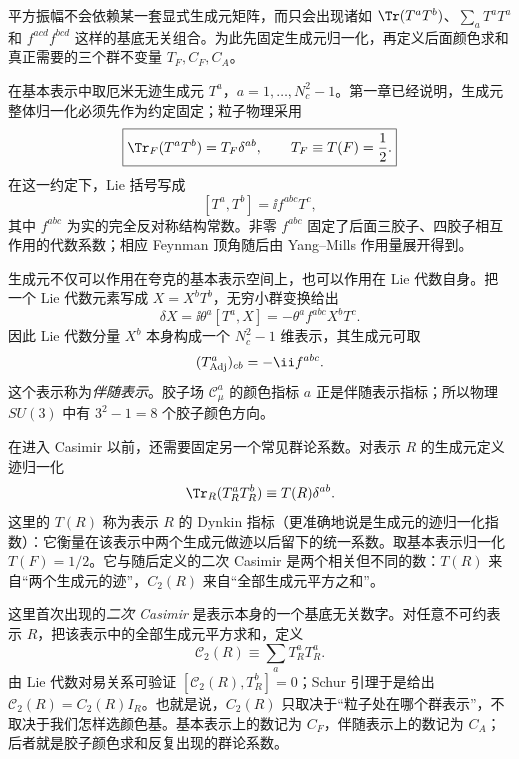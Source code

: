 平方振幅不会依赖某一套显式生成元矩阵，而只会出现诸如 $\Tr(T^aT^b)$、$\sum_aT^aT^a$ 和 $f^{acd}f^{bcd}$ 这样的基底无关组合。为此先固定生成元归一化，再定义后面颜色求和真正需要的三个群不变量 $T_F,C_F,C_A$。

在基本表示中取厄米无迹生成元 $T^a$，$a=1,\ldots,N_c^2-1$。第一章已经说明，生成元整体归一化必须先作为约定固定；粒子物理采用
\begin{equation}
 \boxed{
 \Tr_F(T^aT^b)=T_F\delta^{ab},
 \qquad T_F\equiv T(F)=\frac12.}
 \label{eq:SUN-generator-normalization-dp10}
\end{equation}
在这一约定下，Lie 括号写成
\begin{equation}
 \boxed{
 [T^a,T^b]=\ii f^{abc}T^c,}
 \label{eq:SUN-commutator-dp10}
\end{equation}
其中 $f^{abc}$ 为实的完全反对称结构常数。非零 $f^{abc}$ 固定了后面三胶子、四胶子相互作用的代数系数；相应 Feynman 顶角随后由 Yang--Mills 作用量展开得到。

生成元不仅可以作用在夸克的基本表示空间上，也可以作用在 Lie 代数自身。把一个 Lie 代数元素写成 $X=X^bT^b$，无穷小群变换给出
\begin{equation*}
 \delta X=\ii\theta^a[T^a,X]
 =-\theta^af^{abc}X^bT^c.
\end{equation*}
因此 Lie 代数分量 $X^b$ 本身构成一个 $N_c^2-1$ 维表示，其生成元可取
\begin{equation*}
 (T_{\rm Adj}^a)_{cb}=-\ii f^{abc}.
\end{equation*}
这个表示称为\emph{伴随表示}。胶子场 $\mathscr C_\mu^a$ 的颜色指标 $a$ 正是伴随表示指标；所以物理 $SU(3)$ 中有 $3^2-1=8$ 个胶子颜色方向。

在进入 Casimir 以前，还需要固定另一个常见群论系数。对表示 $R$ 的生成元定义迹归一化
\begin{equation*}
 \Tr_R(T_R^aT_R^b)\equiv T(R)\delta^{ab}.
\end{equation*}
这里的 $T(R)$ 称为表示 $R$ 的 Dynkin 指标（更准确地说是生成元的迹归一化指数）：它衡量在该表示中两个生成元做迹以后留下的统一系数。取基本表示归一化 $T(F)=1/2$。它与随后定义的二次 Casimir 是两个相关但不同的数：$T(R)$ 来自“两个生成元的迹”，$C_2(R)$ 来自“全部生成元平方之和”。

这里首次出现的\emph{二次 Casimir} 是表示本身的一个基底无关数字。对任意不可约表示 $R$，把该表示中的全部生成元平方求和，定义
\begin{equation*}
 \mathcal C_2(R)\equiv\sum_a T_R^aT_R^a.
\end{equation*}
由 Lie 代数对易关系可验证 $[\mathcal C_2(R),T_R^b]=0$；Schur 引理于是给出 $\mathcal C_2(R)=C_2(R)I_R$。也就是说，$C_2(R)$ 只取决于“粒子处在哪个群表示”，不取决于我们怎样选颜色基。基本表示上的数记为 $C_F$，伴随表示上的数记为 $C_A$；后者就是胶子颜色求和反复出现的群论系数。

